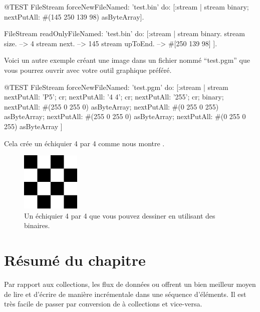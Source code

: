 \documentclass[a4paper,10pt,twoside]{book}
\begin{document}
\begin{code}{@TEST}
FileStream
  forceNewFileNamed: 'test.bin'
  do: [:stream |
          stream
            binary;
            nextPutAll: #(145 250 139 98) asByteArray].

FileStream
  readOnlyFileNamed: 'test.bin'
  do: [:stream |
          stream binary.
          stream size.         --> 4
          stream next.         --> 145
          stream upToEnd. --> #[250 139 98]
      ].
\end{code}

Voici un autre exemple créant une image dans un fichier nommé
``test.pgm'' que vous pourrez ouvrir avec votre outil graphique
préféré.

\begin{code}{@TEST}
FileStream
  forceNewFileNamed: 'test.pgm' 
  do: [:stream |
	stream
		nextPutAll: 'P5'; cr;
		nextPutAll: '4 4'; cr;
		nextPutAll: '255'; cr;
		binary;
		nextPutAll: #(255 0 255 0) asByteArray;
		nextPutAll: #(0 255 0 255) asByteArray;
		nextPutAll: #(255 0 255 0) asByteArray;
		nextPutAll: #(0 255 0 255) asByteArray
	]
\end{code}

Cela crée un échiquier 4 par 4 comme nous montre .

\begin{figure}[!ht]
\centerline{\includegraphics[width=0.25\textwidth]{checkerboard4x4}}
\caption{Un échiquier 4 par 4 que vous pouvez dessiner en utilisant des \streams binaires.}
\vspace{.2in}
\end{figure}

\section{Résumé du chapitre}

Par rapport aux collections, les flux de données ou \streams offrent
un bien meilleur moyen de lire et d'écrire de manière
incrémentale dans une séquence d'éléments.
Il est très facile de passer par conversion de \streams à collections et vice-versa.
\end{document}
